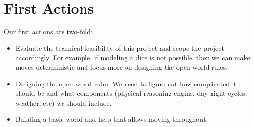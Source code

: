 \documentclass[10pt]{article}
\begin{document}
\section{First Actions}

Our first actions are two-fold:

\begin{itemize}
\item Evaluate the technical feasibility of this project and scope the project accordingly. For example, if modeling a dice is not possible, then we can make moves deterministic and focus more on designing the open-world rules.
\item Designing the open-world rules. We need to figure out how complicated it should be and what components (physical reasoning engine, day-night cycles, weather, etc) we should include.
\item Building a basic world and hero that allows moving throughout.
\end{itemize}




\end{document}
